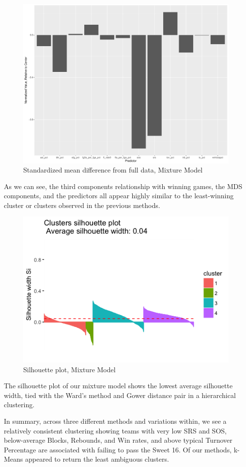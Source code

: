\documentclass[10pt,a4paper, hidelinks]{article} %
\begin{document}
\begin{figure}[H]
	\centering
	\includegraphics[width=0.7\linewidth]{../fig/mixweak}
	\caption{Standardized mean difference from full data, Mixture Model}
\end{figure}

As we can see, the third components relationship with winning games, the MDS components, and the predictors all appear highly similar to the least-winning cluster or clusters observed in the previous methods.

\begin{figure}[H]
	\centering
	\includegraphics[width=0.7\linewidth]{"../fig/mixsil"}
	\caption{Silhouette plot, Mixture Model}
\end{figure}

The silhouette plot of our mixture model shows the lowest average silhouette width, tied with the Ward's method and Gower distance pair in a hierarchical clustering.

In summary, across three different methods and variations within, we see a relatively consistent clustering showing teams with very low SRS and SOS, below-average Blocks, Rebounds, and Win rates, and above typical Turnover Percentage are associated with failing to pass the Sweet 16.  Of our methods, k-Means appeared to return the least ambiguous clusters.
\end{document}
